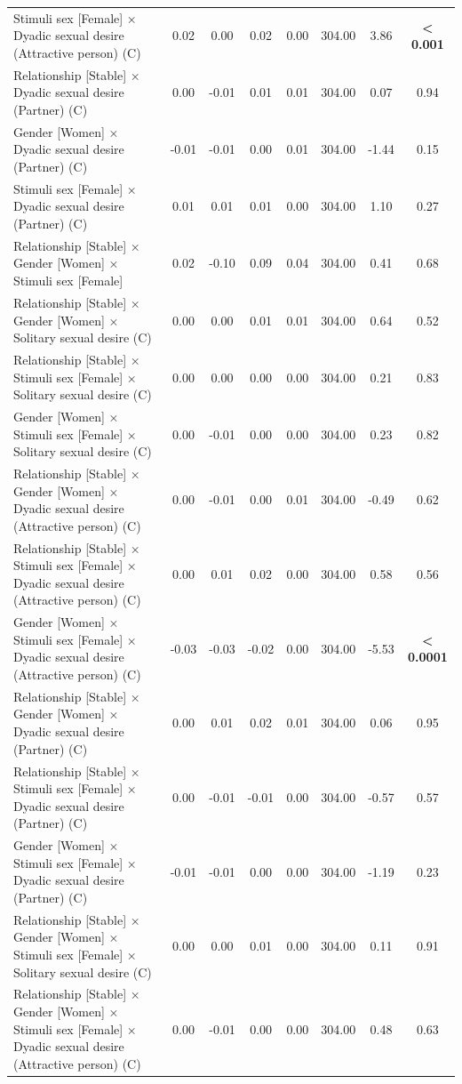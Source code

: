 \documentclass[
  bookmarksnumbered]{article}
\begin{document}
\begin{table}[H]
{\begin{threeparttable}
\begin{tabular}[t]{lccccccc}
Stimuli sex [Female] × Dyadic sexual desire (Attractive person) (C) & 0.02 & 0.00 & 0.02 & 0.00 & 304.00 & 3.86 & \textbf{< 0.001}\\
Relationship [Stable] × Dyadic sexual desire (Partner) (C) & 0.00 & -0.01 & 0.01 & 0.01 & 304.00 & 0.07 & 0.94\\
Gender [Women] × Dyadic sexual desire (Partner) (C) & -0.01 & -0.01 & 0.00 & 0.01 & 304.00 & -1.44 & 0.15\\
Stimuli sex [Female] × Dyadic sexual desire (Partner) (C) & 0.01 & 0.01 & 0.01 & 0.00 & 304.00 & 1.10 & 0.27\\
Relationship [Stable] × Gender [Women] × Stimuli sex [Female] & 0.02 & -0.10 & 0.09 & 0.04 & 304.00 & 0.41 & 0.68\\
Relationship [Stable] × Gender [Women] × Solitary sexual desire (C) & 0.00 & 0.00 & 0.01 & 0.01 & 304.00 & 0.64 & 0.52\\
Relationship [Stable] × Stimuli sex [Female] × Solitary sexual desire (C) & 0.00 & 0.00 & 0.00 & 0.00 & 304.00 & 0.21 & 0.83\\
Gender [Women] × Stimuli sex [Female] × Solitary sexual desire (C) & 0.00 & -0.01 & 0.00 & 0.00 & 304.00 & 0.23 & 0.82\\
Relationship [Stable] × Gender [Women] × Dyadic sexual desire (Attractive person) (C) & 0.00 & -0.01 & 0.00 & 0.01 & 304.00 & -0.49 & 0.62\\
Relationship [Stable] × Stimuli sex [Female] × Dyadic sexual desire (Attractive person) (C) & 0.00 & 0.01 & 0.02 & 0.00 & 304.00 & 0.58 & 0.56\\
Gender [Women] × Stimuli sex [Female] × Dyadic sexual desire (Attractive person) (C) & -0.03 & -0.03 & -0.02 & 0.00 & 304.00 & -5.53 & \textbf{< 0.0001}\\
Relationship [Stable] × Gender [Women] × Dyadic sexual desire (Partner) (C) & 0.00 & 0.01 & 0.02 & 0.01 & 304.00 & 0.06 & 0.95\\
Relationship [Stable] × Stimuli sex [Female] × Dyadic sexual desire (Partner) (C) & 0.00 & -0.01 & -0.01 & 0.00 & 304.00 & -0.57 & 0.57\\
Gender [Women] × Stimuli sex [Female] × Dyadic sexual desire (Partner) (C) & -0.01 & -0.01 & 0.00 & 0.00 & 304.00 & -1.19 & 0.23\\
Relationship [Stable] × Gender [Women] × Stimuli sex [Female] × Solitary sexual desire (C) & 0.00 & 0.00 & 0.01 & 0.00 & 304.00 & 0.11 & 0.91\\
Relationship [Stable] × Gender [Women] × Stimuli sex [Female] × Dyadic sexual desire (Attractive person) (C) & 0.00 & -0.01 & 0.00 & 0.00 & 304.00 & 0.48 & 0.63\\

\end{tabular}
\end{threeparttable}}
\end{table}
\end{document}
